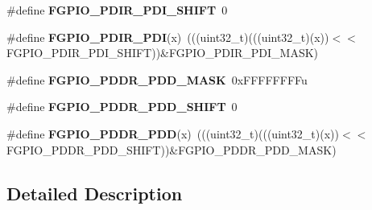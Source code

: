 \begin{DoxyCompactItemize}
\mbox{\label{group___f_g_p_i_o___register___masks_gaadc2ff381ef7eb1254eaab329f935aae}} 
\#define {\bfseries F\+G\+P\+I\+O\+\_\+\+P\+D\+I\+R\+\_\+\+P\+D\+I\+\_\+\+S\+H\+I\+FT}~0
\item 
\mbox{\label{group___f_g_p_i_o___register___masks_gaa197ae1640b4c22ba461518f607c5608}} 
\#define {\bfseries F\+G\+P\+I\+O\+\_\+\+P\+D\+I\+R\+\_\+\+P\+DI}(x)~(((uint32\+\_\+t)(((uint32\+\_\+t)(x))$<$$<$F\+G\+P\+I\+O\+\_\+\+P\+D\+I\+R\+\_\+\+P\+D\+I\+\_\+\+S\+H\+I\+FT))\&F\+G\+P\+I\+O\+\_\+\+P\+D\+I\+R\+\_\+\+P\+D\+I\+\_\+\+M\+A\+SK)
\item 
\mbox{\label{group___f_g_p_i_o___register___masks_gad20f346c1d3d80b99ea1dc94aa53898d}} 
\#define {\bfseries F\+G\+P\+I\+O\+\_\+\+P\+D\+D\+R\+\_\+\+P\+D\+D\+\_\+\+M\+A\+SK}~0x\+F\+F\+F\+F\+F\+F\+F\+Fu
\item 
\mbox{\label{group___f_g_p_i_o___register___masks_gaae41c1c9d3ee91071f4f2a58b771754e}} 
\#define {\bfseries F\+G\+P\+I\+O\+\_\+\+P\+D\+D\+R\+\_\+\+P\+D\+D\+\_\+\+S\+H\+I\+FT}~0
\item 
\mbox{\label{group___f_g_p_i_o___register___masks_gae925ac53df59629914dc58fcf60d4480}} 
\#define {\bfseries F\+G\+P\+I\+O\+\_\+\+P\+D\+D\+R\+\_\+\+P\+DD}(x)~(((uint32\+\_\+t)(((uint32\+\_\+t)(x))$<$$<$F\+G\+P\+I\+O\+\_\+\+P\+D\+D\+R\+\_\+\+P\+D\+D\+\_\+\+S\+H\+I\+FT))\&F\+G\+P\+I\+O\+\_\+\+P\+D\+D\+R\+\_\+\+P\+D\+D\+\_\+\+M\+A\+SK)
\end{DoxyCompactItemize}


\subsection{Detailed Description}
